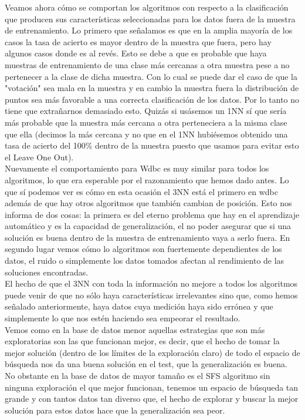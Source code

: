 \documentclass[10pt,a4paper]{article}
\begin{document}
Veamos ahora cómo se comportan los algoritmos con respecto a la clasificación que producen sus características seleccionadas para los datos fuera de la muestra de entrenamiento. Lo primero que señalamos es que en la amplia mayoría de los casos la tasa de acierto es mayor dentro de la muestra que fuera, pero hay algunos casos donde es al revés. Esto se debe a que es probable que haya muestras de entrenamiento de una clase más cercanas a otra muestra pese a no pertenecer a la clase de dicha muestra. Con lo cual se puede dar el caso de que la "votación" sea mala en la muestra y en cambio la muestra fuera la distribución de puntos sea más favorable a una correcta clasificación de los datos. Por lo tanto no tiene que extrañarnos demasiado esto. Quizás si usásemos un 1NN sí que sería más probable que la muestra más cercana a otra perteneciera a la misma clase que ella (decimos la más cercana y no que en el 1NN hubiésemos obtenido una tasa de acierto del 100\% dentro de la muestra puesto que usamos para evitar esto el Leave One Out).\\

Nuevamente el comportamiento para Wdbc es muy similar para todos los algoritmos, lo que era esperable por el razonamiento que hemos dado antes. Lo que sí podemos ver es cómo en esta ocasión el 3NN está el primero en wdbc además de que hay otros algoritmos que también cambian de posición. Esto nos informa de dos cosas: la primera es del eterno problema que hay en el aprendizaje automático y es la capacidad de generalización, el no poder asegurar que si una solución es buena dentro de la muestra de entrenamiento vaya a serlo fuera. En segundo lugar vemos cómo lo algoritmos son fuertemente dependientes de los datos, el ruido o simplemente los datos tomados afectan al rendimiento de las soluciones encontradas.\\

El hecho de que el 3NN con toda la información no mejore a todos los algoritmos puede venir de que no sólo haya características irrelevantes sino que, como hemos señalado anteriormente, haya datos cuya medición haya sido errónea y que simplemente lo que nos estén haciendo sea empeorar el resultado.\\

Vemos como en la base de datos menor aquellas estrategias que son más exploratorias son las que funcionan mejor, es decir, que el hecho de tomar la mejor solución (dentro de los límites de la exploración claro) de todo el espacio de búsqueda nos da una buena solución en el test, que la generalización es buena. No obstante en la base de datos de mayor tamaño es el SFS algoritmo sin ninguna exploración el que mejor funcionan, tenemos un espacio de búsqueda tan grande y con tantos datos tan diverso que, el hecho de explorar y buscar la mejor solución para estos datos hace que la generalización sea peor.\\
\end{document}

